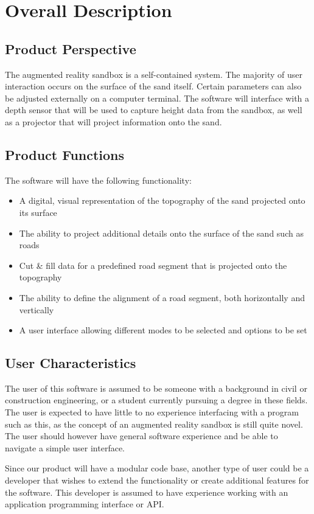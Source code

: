 \documentclass[onecolumn, draftclsnofoot,10pt, compsoc]{IEEEtran}
\begin{document}
\section{Overall Description} 
\subsection{Product Perspective}
The augmented reality sandbox is a self-contained system. The majority of user interaction occurs on the surface of the sand itself. 
Certain parameters can also be adjusted externally on a computer terminal.
The software will interface with a depth sensor that will be used to capture height data from the sandbox, as well as a projector that will project information onto the sand.

\subsection{Product Functions}
The software will have the following functionality:
\begin{itemize}
\item A digital, visual representation of the topography of the sand projected onto its surface
\item The ability to project additional details onto the surface of the sand such as roads
\item Cut \& fill data for a predefined road segment that is projected onto the topography
\item The ability to define the alignment of a road segment, both horizontally and vertically
\item A user interface allowing different modes to be selected and options to be set
\end{itemize}

\subsection{User Characteristics}
The user of this software is assumed to be someone with a background in civil or construction engineering, or a student currently pursuing a degree in these fields.
The user is expected to have little to no experience interfacing with a program such as this, as the concept of an augmented reality sandbox is still quite novel.
The user should however have general software experience and be able to navigate a simple user interface.
\par Since our product will have a modular code base, another type of user could be a developer that wishes to extend the functionality or create additional features for the software. This developer is assumed to have experience working with an application programming interface or API.
\end{document}
